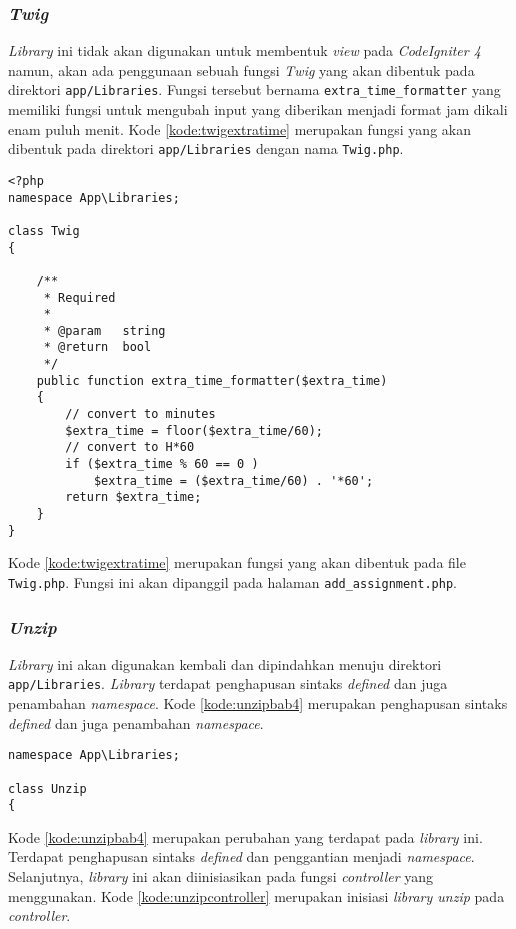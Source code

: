 \subsubsection{\textit{Twig}}
\textit{Library} ini tidak akan digunakan untuk membentuk \textit{view} pada \textit{CodeIgniter 4} namun, akan ada penggunaan sebuah fungsi \textit{Twig} yang akan dibentuk pada direktori \texttt{app/Libraries}. Fungsi tersebut bernama \texttt{extra\_time\_formatter} yang memiliki fungsi untuk mengubah input yang diberikan menjadi format jam dikali enam puluh menit. Kode \ref{kode:twigextratime} merupakan fungsi yang akan dibentuk pada direktori \texttt{app/Libraries} dengan nama \texttt{Twig.php}.
\begin{lstlisting}[caption=Perancangan perubahan \textit{library MY\_Form\_validation} pada \textit{CodeIgniter 4}, label=kode:twigextratime]
<?php
namespace App\Libraries;

class Twig
{

	/**
	 * Required
	 *
	 * @param	string
	 * @return	bool
	 */
	public function extra_time_formatter($extra_time)
	{
		// convert to minutes
		$extra_time = floor($extra_time/60);
		// convert to H*60
		if ($extra_time % 60 == 0 )
			$extra_time = ($extra_time/60) . '*60';
		return $extra_time;
	}
}

\end{lstlisting}

Kode \ref{kode:twigextratime} merupakan fungsi yang akan dibentuk pada file \texttt{Twig.php}. Fungsi ini akan dipanggil pada halaman \texttt{add\_assignment.php}.

\subsubsection{\textit{Unzip}}
\textit{Library} ini akan digunakan kembali dan dipindahkan menuju direktori \texttt{app/Libraries}. \textit{Library} terdapat penghapusan sintaks \textit{defined} dan juga penambahan \textit{namespace}. Kode \ref{kode:unzipbab4} merupakan penghapusan sintaks \textit{defined} dan juga penambahan \textit{namespace}.

\begin{lstlisting}[caption=Perancangan perubahan \textit{library Unzip} pada \textit{CodeIgniter 4}, label=kode:unzipbab4]
namespace App\Libraries;

class Unzip
{
\end{lstlisting}

Kode \ref{kode:unzipbab4} merupakan perubahan yang terdapat pada \textit{library} ini. Terdapat penghapusan sintaks \textit{defined} dan penggantian menjadi \textit{namespace}. Selanjutnya, \textit{library} ini akan diinisiasikan pada fungsi \textit{controller} yang menggunakan. Kode \ref{kode:unzipcontroller} merupakan inisiasi \textit{library unzip} pada \textit{controller}.

